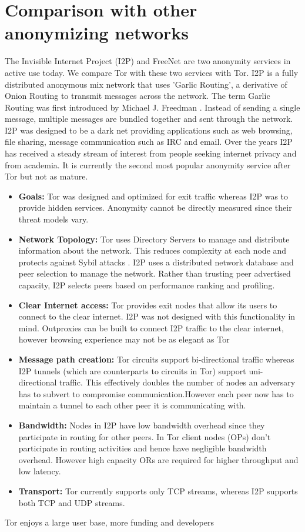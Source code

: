 \documentclass{llncs}
\begin{document}
\section{Comparison with other anonymizing networks} \label{comparison}
The Invisible Internet Project (I2P) \cite{jrandom2003,zantout2011} and FreeNet \cite{freenet} are two anonymity services in active use today. We compare Tor with these two services with Tor.
I2P is a fully distributed anonymous mix network that uses 'Garlic Routing', a derivative of Onion Routing to transmit messages across the network. The term Garlic Routing was first introduced by Michael J. Freedman . Instead of sending a single message, multiple messages are bundled together and sent through the network. I2P was designed to be a dark net providing applications such as web browsing, file sharing, message communication such as IRC and email. Over the years I2P has received a steady stream of interest from people seeking internet privacy and from academia. It is currently the second most popular anonymity service after Tor but not as mature.
\begin{itemize}
	\item[]{\textbf{Goals:} Tor was designed and optimized for exit traffic whereas I2P was to provide hidden services. Anonymity cannot be directly measured since their threat models vary.} 
	\item[]{\textbf{Network Topology:} Tor uses Directory Servers to manage and distribute information about the network. This reduces complexity at each node and protects against Sybil attacks \cite{sybil}. I2P uses a distributed network database and peer selection to manage the network. Rather than trusting peer advertised capacity, I2P selects peers based on performance ranking and profiling.}
	\item[]{\textbf{Clear Internet access:} Tor provides exit nodes that allow its users to connect to the clear internet. I2P was not designed with this functionality in mind. Outproxies can be built to connect I2P traffic to the clear internet, however browsing experience may not be as elegant as Tor \cite{ehlert2011:usability-comparison-i2p-tor}}
	\item[]{\textbf{Message path creation:} Tor circuits support bi-directional traffic whereas I2P tunnels (which are counterparts to circuits in Tor) support uni-directional traffic. This effectively doubles the number of nodes an adversary has to subvert to compromise communication.However each peer now has to maintain a tunnel to each other peer it is communicating with.}
	\item[]{\textbf{Bandwidth:} Nodes in I2P have low bandwidth overhead since they participate in routing for other peers. In Tor client nodes (OPs) don't participate in routing activities and hence have negligible bandwidth overhead. However high capacity ORs are required for higher throughput and low latency.}
	\item[]{\textbf{Transport:} Tor currently supports only TCP streams, whereas I2P supports both TCP and UDP streams.}
\end{itemize}  
Tor enjoys a large user base, more funding and developers 
\end{document}
